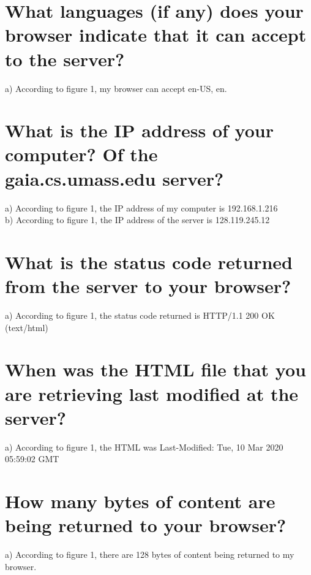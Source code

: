 \documentclass{article}
\begin{document}
\section{What languages (if any) does your browser indicate that it can accept to the
server?}
a)  According to figure 1, my browser can accept en-US, en.\\
\section{What is the IP address of your computer? Of the gaia.cs.umass.edu server?}
a)  According to figure 1, the IP address of my computer is 192.168.1.216\\
\newline b)  According to figure 1, the IP address of the server is 128.119.245.12\\
\section{What is the status code returned from the server to your browser?}
a)  According to figure 1, the status code returned is HTTP/1.1 200 OK (text/html)\\
\section{When was the HTML file that you are retrieving last modified at the server?}
a)  According to figure 1, the HTML was Last-Modified: Tue, 10 Mar 2020 05:59:02 GMT\\
\section{How many bytes of content are being returned to your browser?}
a)  According to figure 1, there are 128 bytes of content being returned to my browser.\\
\end{document}

